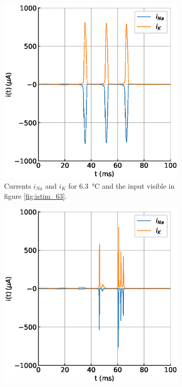 \documentclass{scrartcl}			%
\begin{document}
\begin{figure}[H] 
  \begin{subfigure}[b]{0.5\linewidth}
    \centering
    \includegraphics[width=\linewidth]{imgs/ion_currents_at_6.eps} 
    \caption{Currents $i_{Na}$ and $i_{K}$ for \SI{6.3}{\celsius} and the input visible in figure \ref{fig:istim_63}.} 
    \label{fig:curr_63} 
  \end{subfigure}%
  \quad
  \begin{subfigure}[b]{0.5\linewidth}
    \centering
    \includegraphics[width=\linewidth]{imgs/ion_currents_at_28.eps} 

\end{subfigure}
\end{figure}
\end{document}
